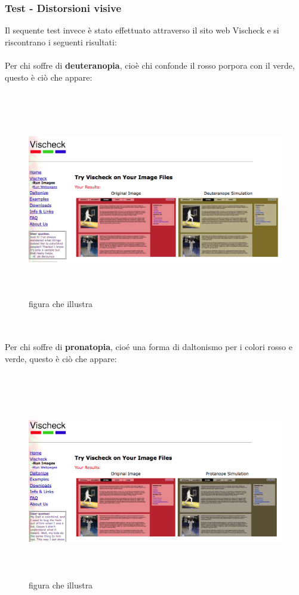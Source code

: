 	\subsubsection {Test - Distorsioni visive}
	Il sequente test invece \`e  stato effettuato attraverso il sito web Vischeck e si riscontrano i seguenti risultati:
	\\
	\\ Per chi soffre di \textbf{deuteranopia}, cio\`e chi confonde il rosso porpora con il verde, questo \`e ci\`o che appare:
	\\
	\\ 
	\begin{figure}[htbp]
		\centering
		\includegraphics[width=150mm, height=85mm]{images/contrasto_pagina_deuteranope.png}
		\caption{figura che illustra}
	\end{figure}	
	\\
	\\ Per chi soffre di \textbf{pronatopia}, cio\'e una forma di daltonismo per i colori rosso e verde,  questo \`e ci\`o che appare:
	\\
	\\ 
	\begin{figure}
		\centering
		\includegraphics[width=150mm, height=85mm]{images/contrasto_pagina_protanope.png}
		\caption{figura che illustra}
	\end{figure}
